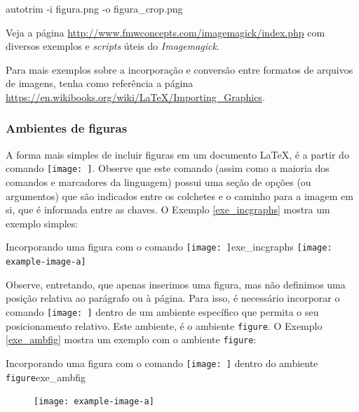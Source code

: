 \begin{commandshell}
autotrim -i figura.png -o figura_crop.png
\end{commandshell}

\begin{marker}
Veja a página \url{http://www.fmwconcepts.com/imagemagick/index.php} com diversos exemplos e \textit{scripts} úteis do \textit{Imagemagick}.
\end{marker}

\begin{marker}
  Para mais exemplos sobre a incorporação e conversão entre formatos de arquivos de imagens, tenha como referência a página \url{https://en.wikibooks.org/wiki/LaTeX/Importing_Graphics}.
\end{marker}

\subsubsection*{Ambientes de figuras}
\label{sec:amb_figs}

A forma mais simples de incluir figuras em um documento \LaTeX{}, é a partir do comando \texttt{\texttt{[image: ]}}. Observe que este comando (assim como a maioria dos comandos e marcadores da linguagem) possui uma seção de opções (ou argumentos) que são indicados entre os colchetes e o caminho para a imagem em si, que é informada entre as chaves. O Exemplo \ref{exe_incgraphs} mostra um exemplo simples:

\begin{texexptitled}[breakable,enhanced,middle=2mm]{Incorporando uma figura com o comando \texttt{\texttt{[image: ]}}}{exe_incgraphs}
\texttt{[image: example-image-a]}
\end{texexptitled}

Observe, entretando, que apenas inserimos uma figura, mas não definimos uma posição relativa ao parágrafo ou à página. Para isso, é necessário incorporar o comando \texttt{\texttt{[image: ]}} dentro de um ambiente específico que permita o seu posicionamento relativo. Este ambiente, é o ambiente {\tt figure}. O Exemplo \ref{exe_ambfig} mostra um exemplo com o ambiente {\tt figure}:

\begin{texexptitled}[breakable,enhanced,middle=2mm]{Incorporando uma figura com o comando \texttt{\texttt{[image: ]}} dentro do ambiente {\tt figure}}{exe_ambfig}
\begin{figure}[H]
\texttt{[image: example-image-a]}
\end{figure}
\end{texexptitled}

